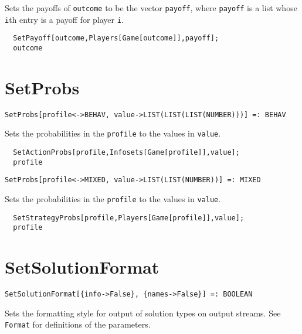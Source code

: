 \noindent
Sets the payoffs of \verb+outcome+ to be the vector \verb+payoff+,
where \verb+payoff+ is a list whose \verb+i+th entry is a payoff for
player \verb+i+.

\udfbody
\begin{verbatim}
  SetPayoff[outcome,Players[Game[outcome]],payoff];
  outcome
\end{verbatim} 


\section*{SetProbs}\label{ExtSetProbs}
\begin{verbatim}
SetProbs[profile<->BEHAV, value->LIST(LIST(LIST(NUMBER)))] =: BEHAV 
\end{verbatim}

\noindent
Sets the probabilities in the \verb+profile+ to the values in
\verb+value+.

\udfbody  
\begin{verbatim}
  SetActionProbs[profile,Infosets[Game[profile]],value];
  profile
\end{verbatim} 

\newsignature

\begin{verbatim}
SetProbs[profile<->MIXED, value->LIST(LIST(NUMBER))] =: MIXED 
\end{verbatim}

\noindent
Sets the probabilities in the \verb+profile+ to the values in
\verb+value+.

\udfbody  
\begin{verbatim}
  SetStrategyProbs[profile,Players[Game[profile]],value];
  profile
\end{verbatim} 


\section*{SetSolutionFormat}\label{ExtSetSolutionFormat}
\begin{verbatim}
SetSolutionFormat[{info->False}, {names->False}] =: BOOLEAN 
\end{verbatim}

\noindent
Sets the formatting style for output of solution types on output
streams.  See \verb+Format+ for definitions of the parameters.

